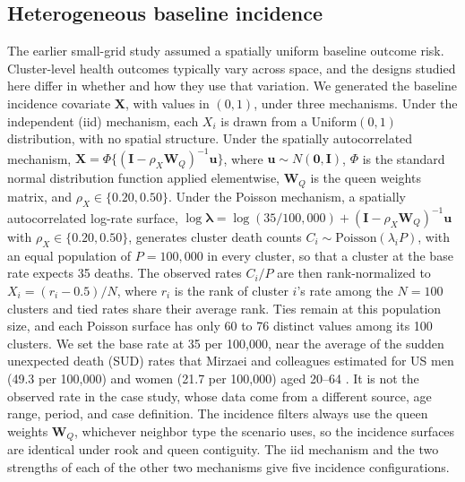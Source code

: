 \documentclass[11pt]{article}
\begin{document}
\subsection{Heterogeneous baseline incidence}\label{heterogeneous-baseline-incidence}


The earlier small-grid study \citep{walther_spatialcrt_2026} assumed a
spatially uniform baseline outcome risk. Cluster-level health outcomes
typically vary across space, and the designs studied here differ in
whether and how they use that variation. We generated the baseline
incidence covariate \(\mathbf{X}\), with values in \((0, 1)\), under three
mechanisms. Under the independent (iid) mechanism, each \(X_i\) is drawn
from a Uniform\((0,1)\) distribution, with no spatial structure. Under
the spatially autocorrelated mechanism,
\(\mathbf{X} = \Phi\{(\mathbf{I} - \rho_X \mathbf{W}_Q)^{-1} \mathbf{u}\}\), where \(\mathbf{u} \sim N(\mathbf{0}, \mathbf{I})\),
\(\Phi\) is the standard normal distribution function applied
elementwise, \(\mathbf{W}_Q\) is the queen weights matrix, and
\(\rho_X \in \{0.20, 0.50\}\). Under the Poisson mechanism, a spatially
autocorrelated log-rate surface,
\(\log \boldsymbol{\lambda} = \log(35/100{,}000) + (\mathbf{I} - \rho_X \mathbf{W}_Q)^{-1} \mathbf{u}\) with
\(\rho_X \in \{0.20, 0.50\}\), generates cluster death counts
\(C_i \sim \text{Poisson}(\lambda_i P)\), with an equal population of
\(P = 100{,}000\) in every cluster, so that a cluster at the base rate
expects 35 deaths. The observed rates \(C_i / P\) are then
rank-normalized to \(X_i = (r_i - 0.5)/N\), where \(r_i\) is the rank of
cluster \(i\)'s rate among the \(N = 100\) clusters and tied rates share
their average rank. Ties remain at this population size, and each
Poisson surface has only 60 to 76 distinct values among its 100
clusters. We set the base rate at 35 per 100,000, near the average of
the sudden unexpected death (SUD) rates that Mirzaei and colleagues
estimated for US men (49.3 per 100,000) and women (21.7 per 100,000)
aged 20--64 \citep{mirzaei_years_2019}. It is not the observed rate in
the case study, whose data come from a different source, age range,
period, and case definition. The incidence
filters always use the queen weights \(\mathbf{W}_Q\), whichever neighbor type
the scenario uses, so the incidence surfaces are identical under rook
and queen contiguity. The iid mechanism and the two strengths of each of
the other two mechanisms give five incidence configurations.
\end{document}
